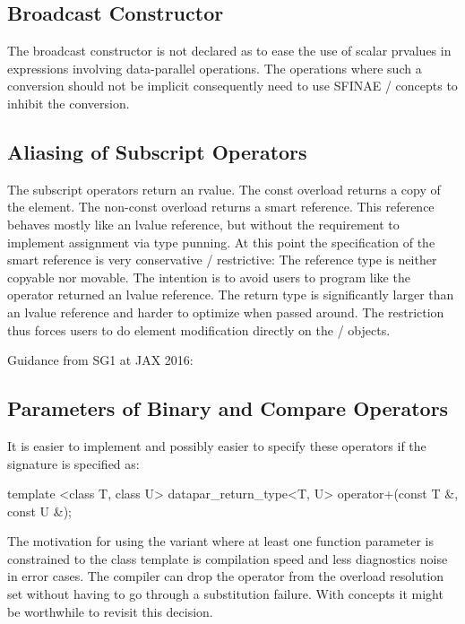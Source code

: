 \subsection{Broadcast Constructor}
The broadcast constructor is not declared as  to ease the use of scalar prvalues in expressions involving data-parallel operations.
The operations where such a conversion should not be implicit consequently need to use SFINAE / concepts to inhibit the conversion.

\subsection{Aliasing of Subscript Operators}
The subscript operators return an rvalue.
The const overload returns a copy of the element.
The non-const overload returns a smart reference.
This reference behaves mostly like an lvalue reference, but without the requirement to implement assignment via type punning.
At this point the specification of the smart reference is very conservative / restrictive:
The reference type is neither copyable nor movable.
The intention is to avoid users to program like the operator returned an lvalue reference.
The return type is significantly larger than an lvalue reference and harder to optimize when passed around.
The restriction thus forces users to do element modification directly on the \datapar / \mask objects.

Guidance from SG1 at JAX 2016:\\


\subsection{Parameters of Binary and Compare Operators}
It is easier to implement and possibly easier to specify these operators if the signature is specified as:
\begin{itemdecl}
template <class T, class U>
datapar_return_type<T, U> operator+(const T &, const U &);
\end{itemdecl}
The motivation for using the variant where at least one function parameter is constrained to the \datapar class template is compilation speed and less diagnostics noise in error cases.
The compiler can drop the operator from the overload resolution set without having to go through a substitution failure.
With concepts it might be worthwhile to revisit this decision.


